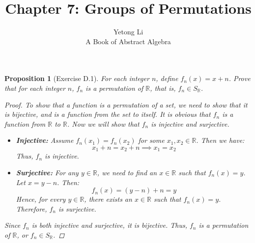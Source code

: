 \documentclass[12pt]{article}
\newcommand{\R}{\mathbb{R}} %
\newtheorem{proposition}{Proposition}
\begin{document}

\title{Chapter 7: Groups of Permutations}
\author{Yetong Li \\ A Book of Abstract Algebra}

\maketitle


\begin{proposition}[Exercise D.1]
  For each integer $n$, define $f_n(x) = x + n$.
  Prove that for each integer $n$, $f_n$ is a permutation of $\R$,
  that is, $f_n \in S_{\R}$.
  \begin{proof}
    To show that a function is a permutation of a set, we need to show that it is bijective,
    and is a function from the set to itself.
    It is obvious that $f_n$ is a function from $\R$ to $\R$.
    Now we will show that $f_n$ is injective and surjective.
    \begin{itemize}
      \item \textbf{Injective:} Assume $f_n(x_1) = f_n(x_2)$ for some $x_1, x_2 \in \R$.
            Then we have:
            \[
              x_1 + n = x_2 + n \implies x_1 = x_2
            \]
            Thus, $f_n$ is injective.

      \item \textbf{Surjective:} For any $y \in \R$, we need to find an $x \in \R$ such that $f_n(x) = y$.
            Let $x = y - n$. Then:
            \[
              f_n(x) = (y - n) + n = y
            \]
            Hence, for every $y \in \R$, there exists an $x \in \R$ such that $f_n(x) = y$.
            Therefore, $f_n$ is surjective.
    \end{itemize}
    Since $f_n$ is both injective and surjective, it is bijective.
    Thus, $f_n$ is a permutation of $\R$, or $f_n \in S_{\R}$.
  \end{proof}
\end{proposition}
\end{document}
